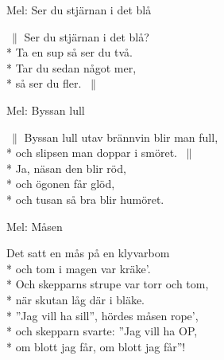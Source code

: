\begin{SongText}
    \begin{SongInfo}
        Mel: Ser du stjärnan i det blå
    \end{SongInfo}
    \begin{SongVerse}
        $\:\|$ Ser du stjärnan i det blå?\\*%
        Ta en sup så ser du två.\\*%
        Tar du sedan något mer,\\*%
        så ser du fler. $\:\|$
    \end{SongVerse}
\end{SongText}
\begin{SongText}
    \begin{SongInfo}
        Mel: Byssan lull
    \end{SongInfo}
    \begin{SongVerse}
        $\:\|$ Byssan lull utav brännvin blir man full,\\*%
        och slipsen man doppar i smöret. $\:\|$\\*%
        Ja, näsan den blir röd,\\*%
        och ögonen får glöd,\\*%
        och tusan så bra blir humöret.
    \end{SongVerse}
\end{SongText}
\begin{SongText}[Måsen]
    \begin{SongInfo}
        Mel: Måsen
    \end{SongInfo}
    \begin{SongVerse}
        Det satt en mås på en klyvarbom\\*%
        och tom i magen var kräke’.\\*%
        Och skepparns strupe var torr och tom,\\*%
        när skutan låg där i bläke.\\*%
        ”Jag vill ha sill”, hördes måsen rope’,\\*%
        och skepparn svarte: ”Jag vill ha OP,\\*%
        om blott jag får, om blott jag får”!
    \end{SongVerse}
\end{SongText}
